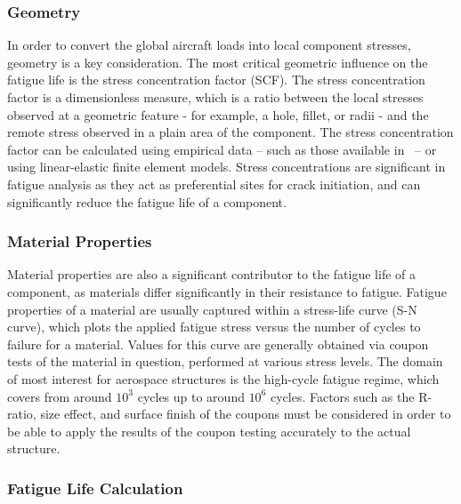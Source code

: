 \subsubsection{Geometry}

In order to convert the global aircraft loads into local component stresses, geometry is a key consideration. The most critical geometric influence on the fatigue life is the stress concentration factor (SCF). The stress concentration factor is a dimensionless measure, which is a ratio between the local stresses observed at a geometric feature {-} for example, a hole, fillet, or radii {-} and the remote stress observed in a plain area of the component. The stress concentration factor can be calculated using empirical data -- such as those available in\ \cite{pilkey_petersons_2008} -- or using linear-elastic finite element models. Stress concentrations are significant in fatigue analysis as they act as preferential sites for crack initiation, and can significantly reduce the fatigue life of a component.

\subsubsection{Material Properties}

Material properties are also a significant contributor to the fatigue life of a component, as materials differ significantly in their resistance to fatigue. Fatigue properties of a material are usually captured within a stress-life curve (S-N curve), which plots the applied fatigue stress versus the number of cycles to failure for a material. Values for this curve are generally obtained via coupon tests of the material in question, performed at various stress levels. The domain of most interest for aerospace structures is the high-cycle fatigue regime, which covers from around $10^3$ cycles up to around $10^6$ cycles. Factors such as the R-ratio, size effect, and surface finish of the coupons must be considered in order to be able to apply the results of the coupon testing accurately to the actual structure.

\subsubsection{Fatigue Life Calculation}

